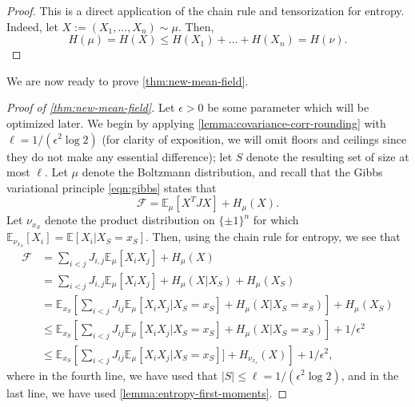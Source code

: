 \documentclass[11pt, oneside, english]{article}
\newcommand{\bE}{\mathbb{E}}
\newcommand{\F}{\mathcal{F}}
\newcommand{\E}{\bE}      %
\newtheorem{theorem}{Theorem}[section]
\theoremstyle{definition}
\theoremstyle{plain}
\begin{document}
\begin{proof}
This is a direct application of the chain rule and tensorization for entropy. Indeed, let $X := (X_1,\dots,X_n) \sim \mu$. Then,
$$H(\mu) = H(X) \leq H(X_1)+\dots+H(X_n) = H(\nu).$$
\end{proof}
We are now ready to prove \cref{thm:new-mean-field}. 
\begin{proof}[Proof of \cref{thm:new-mean-field}]
Let $\epsilon > 0$ be some parameter which will be optimized later. We begin by applying \cref{lemma:covariance-corr-rounding} with $\ell = 1/(\epsilon^{2}\log{2})$ (for clarity of exposition, we will omit floors and ceilings since they do not make any essential difference); let $S$ denote the resulting set of size at most $\ell$. Let $\mu$ denote the Boltzmann distribution, and recall that the Gibbs variational principle \cref{eqn:gibbs} states that
$$\F = \E_{\mu}\left[X^{T}JX\right] + H_{\mu}(X).$$
Let $\nu_{x_S}$ denote the product distribution on $\{\pm 1\}^{n}$ for which $\E_{\nu_{x_S}}[X_i] = \E[X_i | X_S = x_S]$.
Then, using the chain rule for entropy, we see that
\begin{align*}
\F
&= \sum_{i < j} J_{i,j}\E_{\mu}[X_iX_j] + H_{\mu}(X) \\
&= \sum_{i < j} J_{i,j}\E_{\mu}[X_iX_j] + H_{\mu}(X|X_S) + H_{\mu}(X_S)\\
&= \E_{x_S}\left[\sum_{i<j} J_{ij}\E_{\mu}[X_i X_j | X_S = x_S] + H_{\mu}(X | X_{S} = x_S)\right] + H_{\mu}(X_S) \\
&\le \E_{x_S}\left[\sum_{i<j} J_{ij}\E_{\mu}[X_i X_j | X_S = x_S] + H_{\mu}(X | X_{S} = x_S)\right] + 1/\epsilon^2 \\
& \leq \E_{x_S}\left[\sum_{i<j} J_{ij}\E_{\mu}[X_i X_j | X_S = x_S]] + H_{\nu_{x_s}}(X)\right] + 1/\epsilon^2,
\end{align*}
where in the fourth line, we have used that $|S| \le \ell = 1/(\epsilon^{2}\log{2})$, and in the last line, we have used \cref{lemma:entropy-first-moments}. 

\end{proof}
\end{document}
